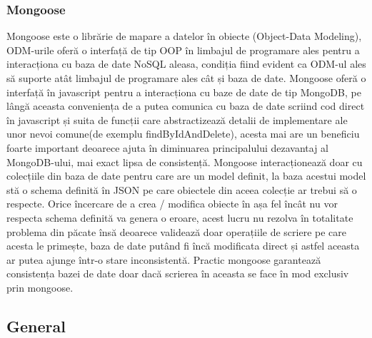 \documentclass[12pt,a4paper,hidelinks]{report}
\theoremstyle{definition}
\theoremstyle{remark}
\begin{document}
\subsubsection{Mongoose}
Mongoose este o librărie de mapare a datelor în obiecte (Object-Data Modeling), ODM-urile 
oferă o interfață de tip OOP în limbajul de programare ales pentru a interacționa cu baza de date NoSQL aleasa,
condiția fiind evident ca ODM-ul ales să suporte atât
limbajul de programare ales cât și baza de date. Mongoose oferă o interfață în javascript pentru 
a interacționa cu baze de date de tip MongoDB, pe lângă aceasta conveniența de a putea comunica cu baza de date 
scriind cod direct în javascript și suita de funcții care abstractizează detalii de implementare ale unor
nevoi comune(de exemplu findByIdAndDelete), acesta mai are un beneficiu foarte important  
deoarece ajuta în diminuarea principalului dezavantaj al MongoDB-ului, mai exact lipsa de consistență.
Mongoose interacționează doar cu colecțiile din baza de date pentru care are un model definit, la baza acestui 
model stă o schema definită în JSON pe care obiectele din aceea colecție ar trebui să o respecte. Orice încercare
de a crea / modifica obiecte în așa fel încât nu vor respecta schema definită va genera o eroare, acest lucru 
nu rezolva în totalitate problema din păcate însă deoarece validează doar operațiile de scriere pe care acesta le primește,  
baza de date putând fi încă modificata direct și astfel aceasta ar putea ajunge într-o stare inconsistentă. 
Practic mongoose garantează consistența bazei de date doar dacă scrierea în aceasta se face în mod exclusiv
prin mongoose.
\subsection{General}
\end{document}
